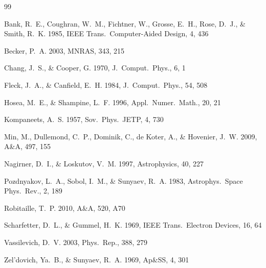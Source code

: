 \documentclass[11pt]{article}
\begin{document}
\begin{thebibliography}{99}

Bank, R.~E., Coughran, W.~M., Fichtner, W., Grosse, E.~H., Rose, D.~J., \&
Smith, R.~K. 1985, IEEE Trans.\ Computer-Aided Design, 4, 436

Becker, P.~A. 2003, MNRAS, 343, 215

Chang, J.~S., \& Cooper, G. 1970, J.\ Comput.\ Phys., 6, 1

Fleck, J.~A., \& Canfield, E.~H. 1984, J.\ Comput.\ Phys., 54, 508

Hosea, M.~E., \& Shampine, L.~F. 1996, Appl.\ Numer.\ Math., 20, 21

Kompaneets, A.~S. 1957, Sov.\ Phys.\ JETP, 4, 730

Min, M., Dullemond, C.~P., Dominik, C., de Koter, A., \& Hovenier, J.~W.
2009, A\&A, 497, 155

Nagirner, D.~I., \& Loskutov, V.~M. 1997, Astrophysics, 40, 227

Pozdnyakov, L.~A., Sobol, I.~M., \& Sunyaev, R.~A. 1983, Astrophys.\ Space
Phys.\ Rev., 2, 189

Robitaille, T.~P. 2010, A\&A, 520, A70

Scharfetter, D.~L., \& Gummel, H.~K. 1969, IEEE Trans.\ Electron Devices,
16, 64

Vassilevich, D.~V. 2003, Phys.\ Rep., 388, 279

Zel'dovich, Ya.~B., \& Sunyaev, R.~A. 1969, Ap\&SS, 4, 301

\end{thebibliography}
\end{document}
